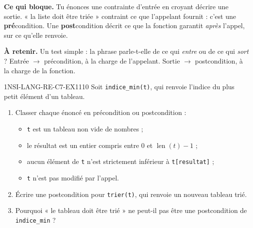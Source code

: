 

\textbf{Ce qui bloque.} Tu énonces une contrainte d'entrée en croyant décrire une sortie.
« la liste doit être triée » contraint ce que l'appelant fournit : c'est une
\textbf{pré}condition. Une \textbf{post}condition décrit ce que la fonction garantit
\emph{après} l'appel, sur ce qu'elle renvoie.

\textbf{À retenir.} Un test simple : la phrase parle-t-elle de ce qui \emph{entre} ou de ce qui
\emph{sort} ? Entrée $\rightarrow$ précondition, à la charge de l'appelant. Sortie
$\rightarrow$ postcondition, à la charge de la fonction.

\begin{exercice}{1NSI-LANG-RE-C7-EX1}{1}{10}
Soit \lstinline{indice_min(t)}, qui renvoie l'indice du plus petit élément d'un tableau.
\begin{enumerate}
  \item Classer chaque énoncé en précondition ou postcondition :
        \begin{itemize}
          \item \lstinline{t} est un tableau non vide de nombres ;
          \item le résultat est un entier compris entre $0$ et $\operatorname{len}(t)-1$ ;
          \item aucun élément de \lstinline{t} n'est strictement inférieur à
                \lstinline{t[resultat]} ;
          \item \lstinline{t} n'est pas modifié par l'appel.
        \end{itemize}
  \item Écrire une postcondition pour \lstinline{trier(t)}, qui renvoie un nouveau tableau
        trié.
  \item Pourquoi « le tableau doit être trié » ne peut-il pas être une postcondition de
        \lstinline{indice_min} ?
\end{enumerate}
\end{exercice}

